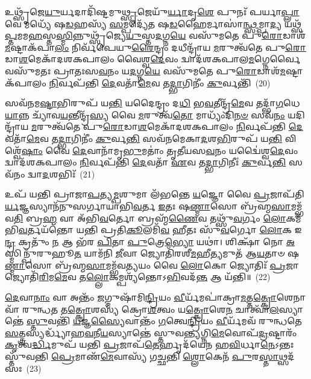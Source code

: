 𑌉𑌥𑍍𑌸𑍃᳴𑌜𑍇\-\ul{𑌯𑍁}\-𑌰𑍍𑌯𑌦𑌾𑌦𑌿᳴𑌷𑍍𑌟𑌮𑍁\-\ul{𑌥𑍍𑌸𑍃}\-𑌜𑍇𑌯𑍁᳴\-\ul{𑌰𑍍𑌯𑌾}\-𑌦𑍃\-\ul{𑌶𑍇} 𑌪𑍁𑌨𑌃᳴ 𑌪𑌰𑍍𑌯𑌾\-\ul{𑌪𑍍𑌲𑌾}\-𑌵𑍇 𑌮𑌧𑍍𑌯𑍇᳴ 𑌷\-\ul{𑌡}\-𑌹𑌸𑍍𑌯᳴ \ul{𑌸}\-𑌮𑍍𑌪𑌦𑍍𑌯𑍇᳴𑌤 𑌷\-\ul{𑌡}\-𑌹𑍈𑌰𑍍𑌮𑌾𑌸𑌾॑\-\ul{𑌨𑍍𑌥𑍍𑌸}\-𑌮𑍍𑌪𑌾\-\ul{𑌦𑍍𑌯} 𑌯𑌥𑍍𑌸᳴\-\ul{𑌪𑍍𑌤}\-𑌮𑌮\-\ul{𑌹}\-\-𑌸𑍍𑌤\-\ul{𑌸𑍍𑌮𑌿}\-𑌨𑍍𑌨𑍁𑌥𑍍𑌸𑍃᳴𑌜𑍍𑌯𑍇\-\ul{𑌯𑍁}\-𑌸𑍍𑌤\-\ul{𑌦}\-𑌗𑍍𑌨\-\ul{𑌯𑍇} 𑌵𑌸𑍁᳴𑌮𑌤𑍇 𑌪𑍁\-\ul{𑌰𑍋}\-𑌡𑌾𑌶᳴\-\-\ul{𑌮}\-𑌷𑍍𑌟𑌾\-𑌕᳴𑌪𑌾\-\ul{𑌲𑌂} 𑌨𑌿𑌰𑍍𑌵᳴𑌪𑍇𑌯𑍁\-\ul{𑌰𑍈}\-𑌨𑍍𑌦𑍍𑌰𑌂 𑌦𑌧𑍀𑌨𑍍𑌦𑍍𑌰𑌾᳴𑌯 \ul{𑌮}\-𑌰𑍁𑌤𑍍𑌵᳴𑌤𑍇 𑌪𑍁\-\ul{𑌰𑍋}\-𑌡𑌾\-\ul{𑌶}\-𑌮𑍇𑌕𑌾᳴\-𑌦𑌶\-𑌕𑌪𑌾𑌲𑌂 𑌵𑍈𑌶𑍍𑌵\-\ul{𑌦𑍇}\-𑌵𑌂 𑌦𑍍𑌵𑌾𑌦᳴𑌶\-𑌕𑌪𑌾𑌲\-\ul{𑌮}\-𑌗𑍍𑌨𑍇𑌰𑍍𑌵𑍈 𑌵𑌸𑍁᳴𑌮𑌤𑌃 𑌪𑍍𑌰𑌾𑌤𑌃𑌸\-\ul{𑌵}\-𑌨𑌂 𑌯\-\ul{𑌦}\-𑌗𑍍𑌨\-\ul{𑌯𑍇} 𑌵𑌸𑍁᳴𑌮𑌤𑍇 𑌪𑍁\-\ul{𑌰𑍋}\-𑌡𑌾𑌶᳴\-\-\ul{𑌮}\-𑌷𑍍𑌟𑌾𑌕᳴𑌪𑌾𑌲𑌂 \ul{𑌨𑌿}\-𑌰𑍍𑌵𑌪᳴𑌨𑍍𑌤𑌿 \ul{𑌦𑍇}\-𑌵𑌤𑌾᳴\-\ul{𑌮𑍇}\-𑌵 𑌤\-\ul{𑌦𑍍𑌭𑌾}\-𑌗𑌿𑌨𑍀𑌂॑ \ul{𑌕𑍁}\-𑌰𑍍𑌵𑌨𑍍𑌤𑌿᳴~(20)

𑌸𑌵᳴𑌨𑌮\-\ul{𑌷𑍍𑌟𑌾}\-𑌭𑌿𑌰𑍁𑌪᳴ 𑌯\-\ul{𑌨𑍍𑌤𑌿} 𑌯𑌦𑍈𑌨𑍍𑌦𑍍𑌰𑌂 𑌦\-\ul{𑌧𑌿} 𑌭\-\ul{𑌵}\-𑌤𑍀𑌨𑍍𑌦𑍍𑌰᳴\-\ul{𑌮𑍇}\-𑌵 𑌤𑌦𑍍𑌭𑌾᳴\-\ul{𑌗}\-𑌧𑍇\-\ul{𑌯𑌾}\-𑌨𑍍𑌨 𑌚𑍍𑌯𑌾᳴𑌵\-\ul{𑌯}\-𑌨𑍍𑌤𑍀𑌨𑍍𑌦𑍍𑌰᳴\-\ul{𑌸𑍍𑌯} 𑌵𑍈 \ul{𑌮}\-𑌰𑍁𑌤𑍍𑌵᳴\-\ul{𑌤𑍋} 𑌮𑌾𑌧𑍍𑌯𑌂᳴𑌦𑌿\-\ul{𑌨}\-\-\ul{𑍞} 𑌸𑌵᳴\-\ul{𑌨𑌂} 𑌯𑌦𑌿𑌨𑍍𑌦𑍍𑌰𑌾᳴𑌯 \ul{𑌮}\-𑌰𑍁𑌤𑍍𑌵᳴𑌤𑍇 𑌪𑍁\-\ul{𑌰𑍋}\-𑌡𑌾\-\ul{𑌶}\-𑌮𑍇𑌕𑌾᳴\-𑌦𑌶\-𑌕𑌪𑌾𑌲𑌂 \ul{𑌨𑌿}\-𑌰𑍍𑌵𑌪᳴𑌨𑍍𑌤𑌿 \ul{𑌦𑍇}\-𑌵𑌤𑌾᳴\-\ul{𑌮𑍇}\-𑌵 𑌤\-\ul{𑌦𑍍𑌭𑌾}\-𑌗𑌿𑌨𑍀𑌂॑ \ul{𑌕𑍁}\-𑌰𑍍𑌵\-\ul{𑌨𑍍𑌤𑌿} 𑌸𑌵᳴𑌨𑌮𑍇𑌕𑌾\-\ul{𑌦}\-𑌶\-\ul{𑌭𑌿}\-𑌰𑍁𑌪᳴ 𑌯\-\ul{𑌨𑍍𑌤𑌿} 𑌵𑌿𑌶𑍍𑌵𑍇᳴\-\ul{𑌷𑌾𑌂} 𑌵𑍈 \ul{𑌦𑍇}\-𑌵𑌾𑌨𑌾᳴𑌮𑍃\-\ul{𑌭𑍁}\-𑌮𑌤𑌾𑌂॑ 𑌤𑍃𑌤𑍀𑌯𑌸\-\ul{𑌵}\-𑌨𑌂 𑌯𑌦𑍍𑌵𑍈॑𑌶𑍍𑌵\-\ul{𑌦𑍇}\-𑌵𑌂 𑌦𑍍𑌵𑌾𑌦᳴𑌶\-𑌕𑌪𑌾𑌲𑌂 \ul{𑌨𑌿}\-𑌰𑍍𑌵𑌪᳴𑌨𑍍𑌤𑌿 \ul{𑌦𑍇}\-𑌵𑌤𑌾᳴ \ul{𑌏}\-𑌵 𑌤\-\ul{𑌦𑍍𑌭𑌾}\-𑌗𑌿𑌨𑍀𑌃॑ \ul{𑌕𑍁}\-𑌰𑍍𑌵\-\ul{𑌨𑍍𑌤𑌿} 𑌸𑌵᳴𑌨𑌂 𑌦𑍍𑌵𑌾\-\ul{𑌦}\-𑌶𑌭𑌿𑌃᳴~(21)

𑌉𑌪᳴ 𑌯𑌨𑍍𑌤𑌿 𑌪𑍍𑌰𑌾𑌜𑌾\-\ul{𑌪}\-𑌤𑍍𑌯\-\ul{𑌮𑍍𑌪}\-𑌶𑍁𑌮𑌾 𑌲᳴𑌭𑌨𑍍𑌤𑍇 \ul{𑌯}\-𑌜𑍍𑌞𑍋 𑌵𑍈 \ul{𑌪𑍍𑌰}\-𑌜𑌾𑌪᳴𑌤𑌿\-\ul{𑌰𑍍𑌯}\-𑌜𑍍𑌞𑌸𑍍𑌯𑌾𑌨᳴𑌨𑍁𑌸𑌰𑍍𑌗𑌾𑌯𑌾𑌭𑌿\-\ul{𑌵}\-𑌰𑍍𑌤 \ul{𑌇}\-𑌤𑌃 𑌷\-\ul{𑌣𑍍𑌮𑌾}\-𑌸𑍋 𑌬𑍍𑌰᳴𑌹𑍍𑌮\-\ul{𑌸𑌾}\-𑌮𑌮𑍍𑌭᳴𑌵\-\ul{𑌤𑌿} 𑌬𑍍𑌰\-\ul{𑌹𑍍𑌮} 𑌵𑌾 𑌅᳴𑌭𑌿\-\ul{𑌵}\-𑌰𑍍𑌤𑍋 𑌬𑍍𑌰𑌹𑍍𑌮᳴\-\ul{𑌣𑍈}\-𑌵 𑌤𑌥𑍍𑌸𑍁᳴\-\ul{𑌵}\-𑌰𑍍𑌗𑌂 \ul{𑌲𑍋}\-𑌕𑌮᳴𑌭𑌿\-\ul{𑌵}\-𑌰𑍍𑌤𑌯᳴𑌨𑍍𑌤𑍋 𑌯𑌨𑍍𑌤𑌿 𑌪𑍍𑌰𑌤𑌿\-\ul{𑌕𑍂}\-𑌲𑌮𑌿᳴\-\ul{𑌵} 𑌹𑍀𑌤𑌃 𑌸𑍁᳴\-\ul{𑌵}\-𑌰𑍍𑌗𑍋 \ul{𑌲𑍋}\-𑌕 𑌇\-\ul{𑌨𑍍𑌦𑍍𑌰} 𑌕𑍍𑌰𑌤𑍁𑌂᳴ \ul{𑌨} 𑌆 𑌭᳴𑌰 \ul{𑌪𑌿}\-𑌤𑌾 \ul{𑌪𑍁}\-𑌤𑍍𑌰𑍇\-\ul{𑌭𑍍𑌯𑍋} 𑌯𑌥𑌾॑। 𑌶𑌿𑌕𑍍𑌷𑌾᳴ 𑌨𑍋 \ul{𑌅}\-𑌸𑍍𑌮𑌿𑌨𑍍𑌪𑍁᳴𑌰𑍁𑌹𑍂\-\ul{𑌤} 𑌯𑌾𑌮᳴𑌨𑌿 \ul{𑌜𑍀}\-𑌵𑌾 𑌜𑍍𑌯𑍋𑌤𑌿᳴𑌰𑌶𑍀\-\ul{𑌮}\-𑌹𑍀\-\ul{𑌤𑍍𑌯}\-𑌮𑍁𑌤᳴ 𑌆\-\ul{𑌯}\-𑌤𑌾𑍞 𑌷\-\ul{𑌣𑍍𑌮𑌾}\-𑌸𑍋 𑌬𑍍𑌰᳴𑌹𑍍𑌮\-\ul{𑌸𑌾}\-𑌮𑌮𑍍𑌭᳴𑌵\-\ul{𑌤𑍍𑌯}\-𑌯𑌂 𑌵𑍈 \ul{𑌲𑍋}\-𑌕𑍋 𑌜𑍍𑌯𑍋𑌤𑌿𑌃᳴ \ul{𑌪𑍍𑌰}\-𑌜𑌾 𑌜𑍍𑌯𑍋𑌤𑌿᳴\-\ul{𑌰𑌿}\-𑌮\-\ul{𑌮𑍇}\-𑌵 𑌤\-\ul{𑌲𑍍𑌲𑍋}\-𑌕𑌮𑍍𑌪𑌶𑍍𑌯᳴𑌨𑍍𑌤𑍋\-𑌽\-\ul{𑌭𑌿}\-𑌵𑌦᳴\-\ul{𑌨𑍍𑌤} 𑌆 𑌯᳴𑌨𑍍𑌤𑌿॥~(22)

{\anuvakamend[{𑌨𑌾𑌦𑌿᳴𑌷𑍍𑌟\-\ul{𑌙𑍍𑌕𑍁}\-𑌰𑍍𑌵𑌨𑍍𑌤𑌿᳴ 𑌦𑍍𑌵𑌾\-\ul{𑌦}\-𑌶\-\ul{𑌭𑌿}\-𑌰𑌿𑌤𑌿᳴ 𑌵𑌿𑍞\-\ul{𑌶}\-𑌤𑌿𑌶𑍍𑌚᳴}]}%

\-\ul{𑌦𑍇}\-𑌵𑌾\-\ul{𑌨𑌾𑌂} 𑌵𑌾 𑌅𑌨𑍍𑌤𑌂᳴ \ul{𑌜}\-𑌗𑍍𑌮𑍁𑌷𑌾᳴𑌮𑌿\-\ul{𑌨𑍍𑌦𑍍𑌰𑌿}\-𑌯𑌂 \ul{𑌵𑍀}\-𑌰𑍍𑌯᳴𑌮𑌪𑌾॑𑌕𑍍𑌰𑌾\-\ul{𑌮}\-𑌤𑍍𑌤\-\ul{𑌤𑍍𑌕𑍍𑌰𑍋}\-𑌶𑍇𑌨𑌾𑌵𑌾᳴ 𑌰𑍁𑌨𑍍𑌧\-\ul{𑌤} 𑌤\-\ul{𑌤𑍍𑌕𑍍𑌰𑍋}\-𑌶𑌸𑍍𑌯᳴ 𑌕𑍍𑌰𑍋\-\ul{𑌶}\-𑌤𑍍𑌵𑌂 𑌯\-\ul{𑌤𑍍𑌕𑍍𑌰𑍋}\-𑌶𑍇\-\ul{𑌨} 𑌚𑌾𑌤𑍍𑌵𑌾᳴\-\ul{𑌲}\-𑌸𑍍𑌯𑌾𑌨𑍍𑌤𑍇॑ \ul{𑌸𑍍𑌤𑍁}\-𑌵𑌨𑍍𑌤𑌿᳴ \ul{𑌯}\-𑌜𑍍𑌞\-\ul{𑌸𑍍𑌯𑍈}\-𑌵𑌾𑌨𑍍𑌤𑌂᳴ \ul{𑌗}\-𑌤𑍍𑌵𑍇\-\ul{𑌨𑍍𑌦𑍍𑌰𑌿}\-𑌯𑌂 \ul{𑌵𑍀}\-𑌰𑍍𑌯᳴𑌮𑌵᳴ 𑌰𑍁𑌨𑍍𑌧𑌤𑍇 \ul{𑌸}\-𑌤𑍍𑌤𑍍𑌰𑌸𑍍𑌯𑌰𑍍𑌦𑍍𑌧𑍍𑌯𑌾᳴𑌹\-\ul{𑌵}\-𑌨𑍀\-\ul{𑌯}\-𑌸𑍍𑌯𑌾𑌨𑍍𑌤𑍇॑ 𑌸𑍍𑌤𑍁𑌵\-\ul{𑌨𑍍𑌤𑍍𑌯}\-𑌗𑍍𑌨𑌿\-\ul{𑌮𑍇}\-𑌵𑍋𑌪᳴\-\ul{𑌦𑍍𑌰}\-𑌷𑍍𑌟𑌾𑌰𑌂᳴ \ul{𑌕𑍃}\-𑌤𑍍𑌵\-\ul{𑌰𑍍𑌦𑍍𑌧𑌿}\-𑌮𑍁𑌪᳴ 𑌯𑌨𑍍𑌤𑌿 \ul{𑌪𑍍𑌰}\-𑌜𑌾𑌪᳴\-\ul{𑌤𑍇}\-𑌰𑍍\mbox{}𑌹𑍃𑌦᳴𑌯𑍇𑌨 𑌹\-\ul{𑌵𑌿}\-𑌰𑍍𑌧𑌾\-\ul{𑌨𑍇}\-\-𑌽𑌨𑍍𑌤𑌃 𑌸𑍍𑌤𑍁᳴𑌵𑌨𑍍𑌤𑌿 \ul{𑌪𑍍𑌰𑍇}\-𑌮𑌾𑌣᳴\-\ul{𑌮𑍇}\-𑌵𑌾𑌸𑍍𑌯᳴ 𑌗𑌚𑍍𑌛𑌨𑍍𑌤𑌿 \ul{𑌶𑍍𑌲𑍋}\-𑌕𑍇𑌨᳴ \ul{𑌪𑍁}\-𑌰\-\ul{𑌸𑍍𑌤𑌾}\-𑌥𑍍𑌸𑌦᳴𑌸𑌃~(23)

